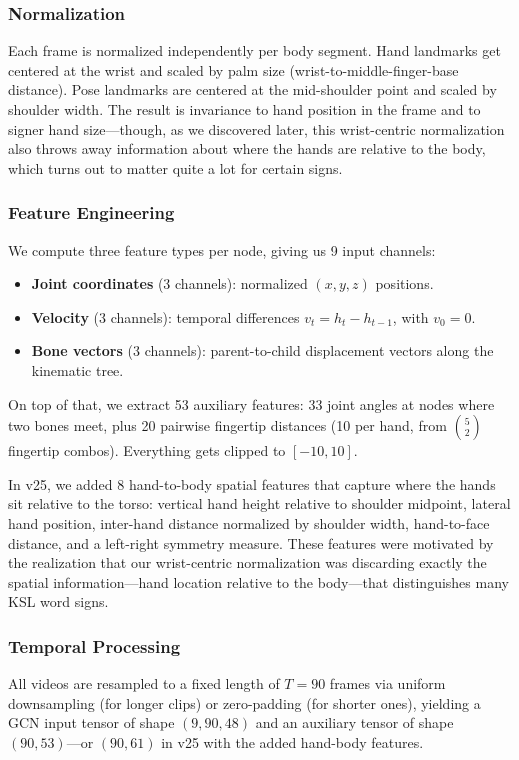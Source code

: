 \documentclass[conference]{IEEEtran}
\begin{document}
\subsubsection{Normalization}
Each frame is normalized independently per body segment. Hand landmarks get centered at the wrist and scaled by palm size (wrist-to-middle-finger-base distance). Pose landmarks are centered at the mid-shoulder point and scaled by shoulder width. The result is invariance to hand position in the frame and to signer hand size---though, as we discovered later, this wrist-centric normalization also throws away information about where the hands are relative to the body, which turns out to matter quite a lot for certain signs.

\subsubsection{Feature Engineering}
We compute three feature types per node, giving us 9 input channels:
\begin{itemize}
    \item \textbf{Joint coordinates} (3 channels): normalized $(x, y, z)$ positions.
    \item \textbf{Velocity} (3 channels): temporal differences $v_t = h_t - h_{t-1}$, with $v_0 = 0$.
    \item \textbf{Bone vectors} (3 channels): parent-to-child displacement vectors along the kinematic tree.
\end{itemize}

On top of that, we extract 53 auxiliary features: 33 joint angles at nodes where two bones meet, plus 20 pairwise fingertip distances (10 per hand, from $\binom{5}{2}$ fingertip combos). Everything gets clipped to $[-10, 10]$.

In v25, we added 8 hand-to-body spatial features that capture where the hands sit relative to the torso: vertical hand height relative to shoulder midpoint, lateral hand position, inter-hand distance normalized by shoulder width, hand-to-face distance, and a left-right symmetry measure. These features were motivated by the realization that our wrist-centric normalization was discarding exactly the spatial information---hand location relative to the body---that distinguishes many KSL word signs.

\subsubsection{Temporal Processing}
All videos are resampled to a fixed length of $T = 90$ frames via uniform downsampling (for longer clips) or zero-padding (for shorter ones), yielding a GCN input tensor of shape $(9, 90, 48)$ and an auxiliary tensor of shape $(90, 53)$---or $(90, 61)$ in v25 with the added hand-body features.
\end{document}
